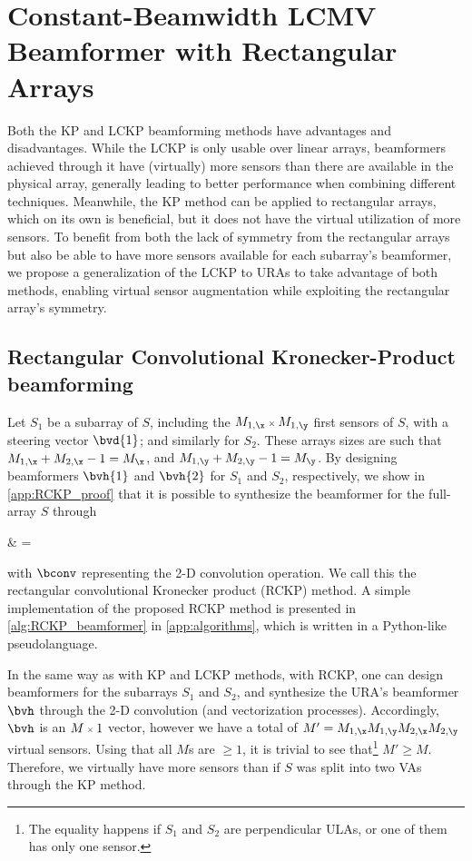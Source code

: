 \section{Constant-Beamwidth LCMV Beamformer with Rectangular Arrays}
\label{sec:cblcmv_beamformer}

Both the KP and LCKP beamforming methods have advantages and disadvantages. While the LCKP is only usable over linear arrays, beamformers achieved through it have (virtually) more sensors than there are available in the physical array, generally leading to better performance when combining different techniques. Meanwhile, the KP method can be applied to rectangular arrays, which on its own is beneficial, but it does not have the virtual utilization of more sensors. To benefit from both the lack of symmetry from the rectangular arrays but also be able to have more sensors available for each subarray's beamformer, we propose a generalization of the LCKP to URAs to take advantage of both methods, enabling virtual sensor augmentation while exploiting the rectangular array's symmetry.

\subsection{Rectangular Convolutional Kronecker-Product beamforming}

Let $S_1$ be a subarray of $S$, including the $\sz{\Mx{1}}{\My{1}}$ first sensors of $S$, with a steering vector $\bvd{1}$; and similarly for $S_2$. These arrays sizes are such that $\Mx{1} + \Mx{2} - 1 = \Mx$, and $\My{1} + \My{2} - 1 = \My$. By designing beamformers $\bvh{1}$ and $\bvh{2}$ for $S_1$ and $S_2$, respectively,  we show in \cref{app:RCKP_proof} that it is possible to synthesize the beamformer for the full-array $S$ through
\begin{equations}\label{eq:def_2D_CKP}
	\bvh
	& =  \eqc
\end{equations}
with $\bconv$ representing the 2-D convolution operation. We call this the rectangular convolutional Kronecker product (RCKP) method. A simple implementation of the proposed RCKP method is presented in \cref{alg:RCKP_beamformer} in \cref{app:algorithms}, which is written in a Python-like pseudolanguage.

In the same way as with KP and LCKP methods, with RCKP, one can design beamformers for the subarrays $S_1$ and $S_2$, and synthesize the URA's beamformer $\bvh$ through the 2-D convolution (and vectorization processes). Accordingly, $\bvh$ is an $\sz{M}{1}$ vector, however we have a total of $M' = \Mx{1} \My{1}  \Mx{2}  \My{2}$ virtual sensors. Using that all $M$s are $\geq 1$, it is trivial to see that\footnote{The equality happens if $S_1$ and $S_2$ are perpendicular ULAs, or one of them has only one sensor.} $M' \geq M$. Therefore, we virtually have more sensors than if $S$ was split into two VAs through the KP method.

